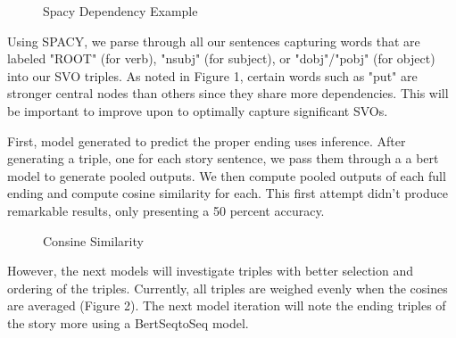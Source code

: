 \documentclass{article}
\begin{document}
\begin{multicols}{2}
\begin{figure}[H]
    \centering
    \caption{Spacy Dependency Example}
\end{figure}

Using SPACY, we parse through all our sentences capturing words that are labeled "ROOT" (for verb), "nsubj" (for subject), or "dobj"/"pobj" (for object) 
into our SVO triples. As noted in Figure 1, certain words such as "put" are stronger central nodes than others since they share more
dependencies.  This will be important to improve upon to optimally capture significant SVOs.

First, model generated to predict the proper ending uses inference. After generating a triple, one for each story sentence, we pass them through a
a bert model to generate pooled outputs. We then compute pooled outputs of each full ending and compute cosine similarity for each. This first 
attempt didn't produce remarkable results, only presenting a 50 percent accuracy.

\begin{figure}[H]
    \centering
    \caption{Consine Similarity}
\end{figure}

However, the next models will investigate triples with better selection and ordering of the triples. Currently, all triples are weighed evenly 
when the cosines are averaged (Figure 2). The next model iteration will note the ending triples of the story more using a BertSeqtoSeq model. 




\end{multicols}
\end{document}
